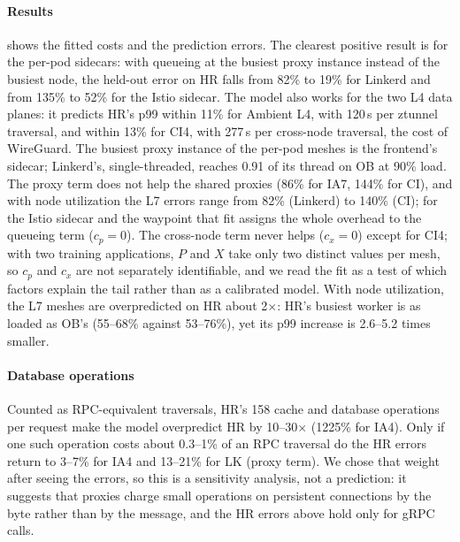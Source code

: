 \paragraph{Results}
 shows the fitted costs and the prediction errors. The
clearest positive result is for the per-pod sidecars: with queueing at the
busiest proxy instance instead of the busiest node, the held-out error on HR
falls from 82\% to 19\% for Linkerd and from 135\% to 52\% for the Istio
sidecar. The model also works for the two L4 data planes: it predicts HR's p99 within 11\% for Ambient
L4, with 120\,\textmu s per ztunnel traversal, and within 13\% for CI4, with
277\,\textmu s per cross-node traversal, the cost of WireGuard. The busiest
proxy instance of the per-pod meshes is the frontend's sidecar; Linkerd's,
single-threaded, reaches 0.91 of its thread on OB at 90\% load. The proxy
term does not help the shared proxies (86\% for IA7, 144\% for CI), and with
node utilization the L7 errors range from 82\% (Linkerd) to 140\% (CI); for
the Istio sidecar and the waypoint that fit assigns the whole overhead to the
queueing term ($c_p = 0$). The cross-node term never helps ($c_x = 0$) except
for CI4; with two training applications, $P$ and $X$ take only two distinct
values per mesh, so $c_p$ and $c_x$ are not separately identifiable, and we
read the fit as a test of which factors explain the tail rather than as a
calibrated model. With node utilization, the L7 meshes are overpredicted on HR
about 2$\times$: HR's busiest worker is as loaded as OB's (55--68\% against
53--76\%), yet its p99 increase is 2.6--5.2 times smaller.

\begin{table}[t]
  \centering
  \caption{Model of the p99 increase (\cref{eq:model}), fitted on echo and OB,
           with the queueing term on the busiest node or on the busiest
           proxy instance. Median relative errors on HR (held out), on the
           placement cells (\cref{tab:placement}), and of the bottleneck law
           $X_{\max} \approx \lambda/\rho_{\text{hot}}$ (median over OB
           and HR). $c_p$, $c_x$, $q$: node variant.}
  \label{tab:model}
  \footnotesize
  \setlength{\tabcolsep}{2.5pt}
  
\end{table}

\paragraph{Database operations}
Counted as RPC-equivalent traversals, HR's 158 cache and database operations
per request make the model overpredict HR by 10--30$\times$ (1225\% for
IA4). Only if one such operation costs about 0.3--1\% of an RPC traversal do
the HR errors return to 3--7\% for IA4 and 13--21\% for LK (proxy term). We
chose that weight after seeing the errors, so this is a sensitivity analysis,
not a prediction: it suggests that proxies charge small operations on
persistent connections by the byte rather than by the message, and the HR
errors above hold only for gRPC calls.

